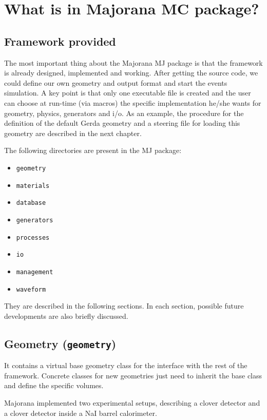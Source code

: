 \documentclass[a4paper,12pt,twoside]{article}
\begin{document}
\section{What is in Majorana MC package?}
\label{sec:what-is-in-majorana-mc-package}

\subsection{Framework provided}
The most important thing about the Majorana MJ package
is that the framework is already designed, implemented 
and working.
After getting the source code, we could define our own geometry 
and output format and start the events simulation. 
A key point is that only one executable 
file is created and the user can choose at run-time (via macros) 
the specific implementation he/she wants for geometry, physics, 
generators and i/o.
As an example, the procedure for the definition of the 
default Gerda geometry and a steering file for loading this geometry
are described in the next chapter.

The following directories are present in the MJ package:
\begin{itemize}
\item {\tt geometry}
\item {\tt materials}
\item {\tt database}
\item {\tt generators}
\item {\tt processes}
\item {\tt io}
\item {\tt management}
\item {\tt waveform}
\end{itemize}

They are described in the following sections.
In each section, possible future developments
are also briefly discussed.

\subsection{Geometry ({\tt geometry}) }
It contains a virtual base geometry class for the interface with 
the rest of the framework.
Concrete classes for new geometries just need to inherit the base 
class and define the specific volumes.

Majorana implemented two experimental setups, describing a clover 
detector and a clover detector inside a NaI barrel calorimeter. 
\end{document}
